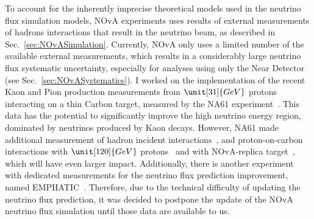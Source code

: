 To account for the inherently imprecise theoretical models used in the neutrino flux simulation models, NOvA experiments uses results of external measurements of hadrons interactions that result in the neutrino beam, as described in Sec.~\ref{sec:NOvASimulation}. Currently, NOvA only uses a limited number of the available external measurements, which results in a considerably large neutrino flux systematic uncertainty, especially for analyses using only the Near Detector (see Sec.~\ref{sec:NOvASystematics}). I worked on the implementation of the recent Kaon and Pion production measurements from $\unit[31]{GeV}$ protons interacting on a thin Carbon target, measured by the NA61 experiment~\cite{2015_hadron_prod_pC_2009data.pdf}. This data has the potential to significantly improve the high neutrino energy region, dominated by neutrinos produced by Kaon decays. However, NA61 made additional measurement of hadron incident interactions~\cite{2019_had_prod_at_Pi_on_C_and_Be.pdf}, and proton-on-carbon interactions with $\unit[120]{GeV}$ protons~\cite{NA61_hadprodFrompC_120GeV_2023.pdf, NA61_ResonanceProdFrompC_120GeV_2023.pdf} and with NOvA-replica target~\cite{ThickTargetLimit.pdf}, which will have even larger impact. Additionally, there is another experiment with dedicated measurements for the neutrino flux prediction improvement, named EMPHATIC~\cite{EMPHATICProposal2019.pdf}.  Therefore, due to the technical difficulty of updating the neutrino flux prediction, it was decided to postpone the update of the NOvA neutrino flux simulation until those data are available to us.



